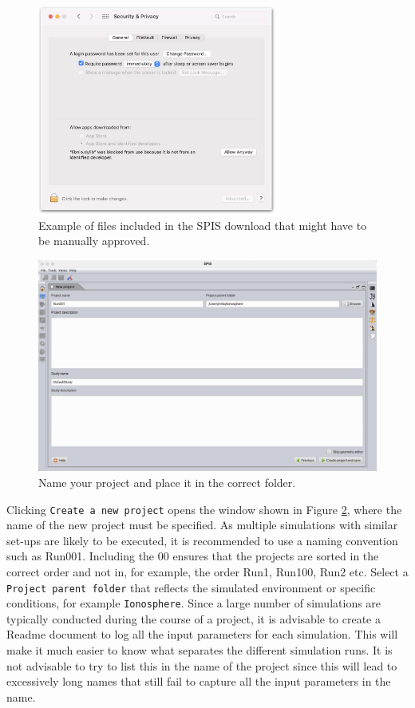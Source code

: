 \documentclass[a4paper, 12pt]{article}
\begin{document}
\begin{figure}[!ht]
    \centering
    \includegraphics[width=0.7\textwidth]{fig8.jpg}
    \caption{Example of files included in the SPIS download that might have to be manually approved.}
    \label{8}
\end{figure}

\begin{figure}[!ht]
    \centering
    \includegraphics[width=1\textwidth]{fig9.jpg}
    \caption{Name your project and place it in the correct folder.}
    \label{9}
\end{figure}

Clicking \verb|Create a new project| opens the window shown in Figure \ref{9}, where the name of the new project must be specified. As multiple simulations with similar set-ups are likely to be executed, it is recommended to use a naming convention such as Run001. Including the 00 ensures that the projects are sorted in the correct order and not in, for example, the order Run1, Run100, Run2 etc. Select a \verb|Project parent folder| that reflects the simulated environment or specific conditions, for example \verb|Ionosphere|. Since a large number of simulations are typically conducted during the course of a project, it is advisable to create a Readme document to log all the input parameters for each simulation. This will make it much easier to know what separates the different simulation runs. It is not advisable to try to list this in the name of the project since this will lead to excessively long names that still fail to capture all the input parameters in the name.
\end{document}
